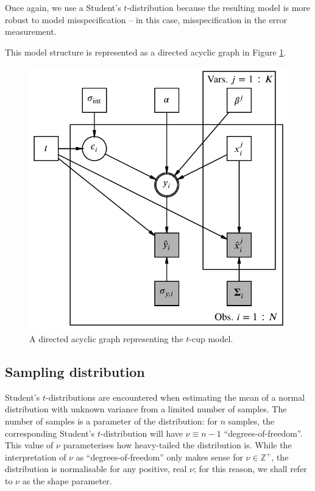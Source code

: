 \documentclass[fleqn,usenatbib]{mnras}
\begin{document}
Once again, we use a Student's $t$-distribution because the resulting model is
more robust to model misspecification -- in this case, misspecification in the
error measurement.

This model structure is represented as a directed acyclic graph in Figure
\ref{fig:formalism.dag}.

\begin{figure}
	\includegraphics[width=\columnwidth]{graphics/dag.pdf}
    \caption{A directed acyclic graph representing the $t$-cup model.}
    \label{fig:formalism.dag}
\end{figure}

\subsection{Sampling distribution}
\label{sec:formalism.sampling}

Student's $t$-distributions are encountered when estimating the mean of a normal
distribution with unknown variance from a limited number of samples. The number
of samples is a parameter of the distribution: for $n$ samples, the
corresponding Student's $t$-distribution will have $\nu \equiv n - 1$
``degrees-of-freedom''. This value of $\nu$ parameterises how heavy-tailed the
distribution is. While the interpretation of $\nu$ as ``degrees-of-freedom''
only makes sense for $\nu \in \mathbb Z^+$, the distribution is normalisable for
any positive, real $\nu$; for this reason, we shall refer to $\nu$ as the shape
parameter.
\end{document}
